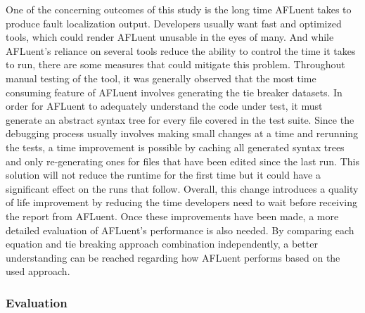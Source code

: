 One of the concerning outcomes of this study is the long time AFLuent takes to
produce fault localization output. Developers usually want fast and optimized
tools, which could render AFLuent unusable in the eyes of many. And while
AFLuent's reliance on several tools reduce the ability to control the time it
takes to run, there are some measures that could mitigate this problem.
Throughout manual testing of the tool, it was generally observed that the most
time consuming feature of AFLuent involves generating the tie breaker datasets.
In order for AFLuent to adequately understand the code under test, it must
generate an abstract syntax tree for every file covered in the test suite. Since
the debugging process usually involves making small changes at a time and
rerunning the tests, a time improvement is possible by caching all generated
syntax trees and only re-generating ones for files that have been edited since
the last run. This solution will not reduce the runtime for the first time but
it could have a significant effect on the runs that follow. Overall, this change
introduces a quality of life improvement by reducing the time developers need to
wait before receiving the report from AFLuent. Once these improvements have been
made, a more detailed evaluation of AFLuent's performance is also needed. By
comparing each equation and tie breaking approach combination independently, a
better understanding can be reached regarding how AFLuent performs based on the
used approach.

\subsubsection{Evaluation}

